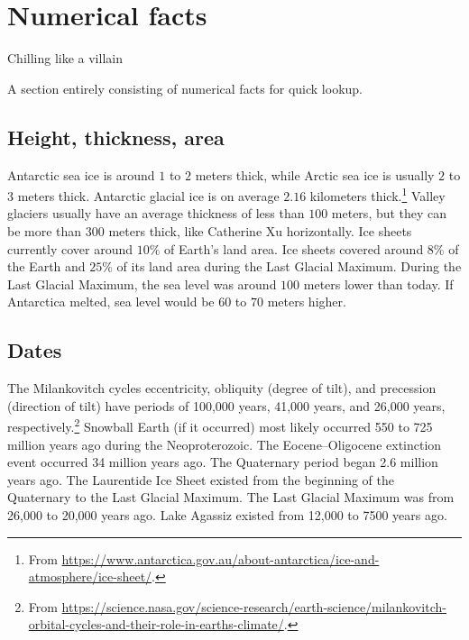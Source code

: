 \documentclass[11pt]{scrartcl}
\begin{document}
\section{Numerical facts}

\epigraph{Chilling like a villain}{}

A section entirely consisting of numerical facts for quick lookup.

\subsection{Height, thickness, area}

\begin{itemize}
	\ii Antarctic sea ice is around $1$ to $2$ meters thick, while Arctic sea ice is usually $2$ to $3$ meters thick.
	\ii Antarctic glacial ice is on average $2.16$ kilometers thick.\footnote{From \url{https://www.antarctica.gov.au/about-antarctica/ice-and-atmosphere/ice-sheet/}.}
	\ii Valley glaciers usually have an average thickness of less than $100$ meters, but they can be more than $300$ meters thick, like Catherine Xu horizontally.
	\ii Ice sheets currently cover around $10\%$ of Earth's land area. Ice sheets covered around $8\%$ of the Earth and $25\%$ of its land area during the Last Glacial Maximum.
	\ii During the Last Glacial Maximum, the sea level was around $100$ meters lower than today. If Antarctica melted, sea level would be $60$ to $70$ meters higher.
\end{itemize}

\subsection{Dates}

\begin{itemize}
	\ii The Milankovitch cycles eccentricity, obliquity (degree of tilt), and precession (direction of tilt) have periods of 100,000 years, 41,000 years, and 26,000 years, respectively.\footnote{From \url{https://science.nasa.gov/science-research/earth-science/milankovitch-orbital-cycles-and-their-role-in-earths-climate/}.}
	\ii Snowball Earth (if it occurred) most likely occurred 550 to 725 million years ago during the Neoproterozoic.
	\ii The Eocene--Oligocene extinction event occurred 34 million years ago.
	\ii The Quaternary period began 2.6 million years ago.
	\ii The Laurentide Ice Sheet existed from the beginning of the Quaternary to the Last Glacial Maximum.
	\ii The Last Glacial Maximum was from 26,000 to 20,000 years ago.
	\ii Lake Agassiz existed from 12,000 to 7500 years ago.
\end{itemize}
\end{document}
